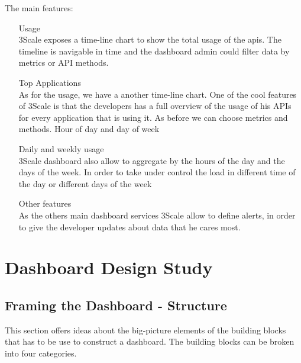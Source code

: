 \documentclass[a4paper,12pt]{report}
\begin{document}
The main features:
\begin{itemize}
\item[Usage] \hfill \\
 3Scale exposes a time-line chart to show the total usage of the apis. The timeline is navigable in time and the dashboard admin could filter data by  metrics or API methods.

\item[Top Applications] \hfill \\
As for the usage, we have a another time-line chart. One of the cool features of 3Scale is that the developers has a full overview of the usage of his APIs for every application that is using it. As before we can choose metrics and methods.
Hour of day and day of week

\item[Daily and weekly usage] \hfill \\
 3Scale dashboard also allow to aggregate by the hours of the day and the days of the week. In order to take under control the load in different time of the day or different days of the week


\item[Other features] \hfill \\
As the others main dashboard services 3Scale allow to define alerts, in order to give the developer updates about data that he cares most.
\end{itemize}

\chapter{Dashboard Design Study}
\section{Framing the Dashboard - Structure}
This section offers ideas about the big-picture elements of the building blocks that has to be use to construct a dashboard. The building blocks can be broken into four categories.
\end{document}
